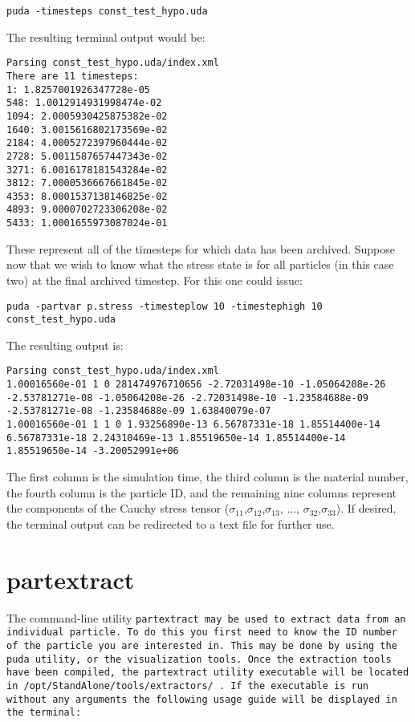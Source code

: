 \begin{Verbatim}[fontsize=\footnotesize]
 puda -timesteps const_test_hypo.uda
\end{Verbatim}
The resulting terminal output would be:
\begin{Verbatim}[fontsize=\footnotesize]
Parsing const_test_hypo.uda/index.xml
There are 11 timesteps:
1: 1.8257001926347728e-05
548: 1.0012914931998474e-02
1094: 2.0005930425875382e-02
1640: 3.0015616802173569e-02
2184: 4.0005272397960444e-02
2728: 5.0011587657447343e-02
3271: 6.0016178181543284e-02
3812: 7.0000536667661845e-02
4353: 8.0001537138146825e-02
4893: 9.0000702723306208e-02
5433: 1.0001655973087024e-01
\end{Verbatim}

These represent all of the timesteps for which data has been archived.
Suppose now that we wish to know what the stress state is for all
particles (in this case two) at the final archived timestep.  For this
one could issue:

\begin{Verbatim}[fontsize=\footnotesize]
puda -partvar p.stress -timesteplow 10 -timestephigh 10 const_test_hypo.uda
\end{Verbatim}

The resulting output is:

\begin{Verbatim}[fontsize=\footnotesize]
Parsing const_test_hypo.uda/index.xml
1.00016560e-01 1 0 281474976710656 -2.72031498e-10 -1.05064208e-26 -2.53781271e-08 -1.05064208e-26 -2.72031498e-10 -1.23584688e-09 -2.53781271e-08 -1.23584688e-09 1.63840079e-07
1.00016560e-01 1 1 0 1.93256890e-13 6.56787331e-18 1.85514400e-14 6.56787331e-18 2.24310469e-13 1.85519650e-14 1.85514400e-14 1.85519650e-14 -3.20052991e+06
\end{Verbatim}

The first column is the simulation time, the third column is the
material number, the fourth column is the particle ID, and the
remaining nine columns represent the components of the Cauchy stress
tensor ($ \sigma_{11}$,$\sigma_{12}$,$\sigma_{13}$, ...,
$\sigma_{32}$,$\sigma_{33}$).  If desired, the terminal output can be
redirected to a text file for further use.

\section{partextract}

The command-line utility \tt partextract \normalfont may be used to
extract data from an individual particle.  To do this you first need
to know the ID number of the particle you are interested in.  This may
be done by using the puda utility, or the visualization tools.  Once
the extraction tools have been compiled, the partextract utility
executable will be located in \tt /opt/StandAlone/tools/extractors/
\normalfont.  If the executable is run without any arguments the
following usage guide will be displayed in the terminal:

